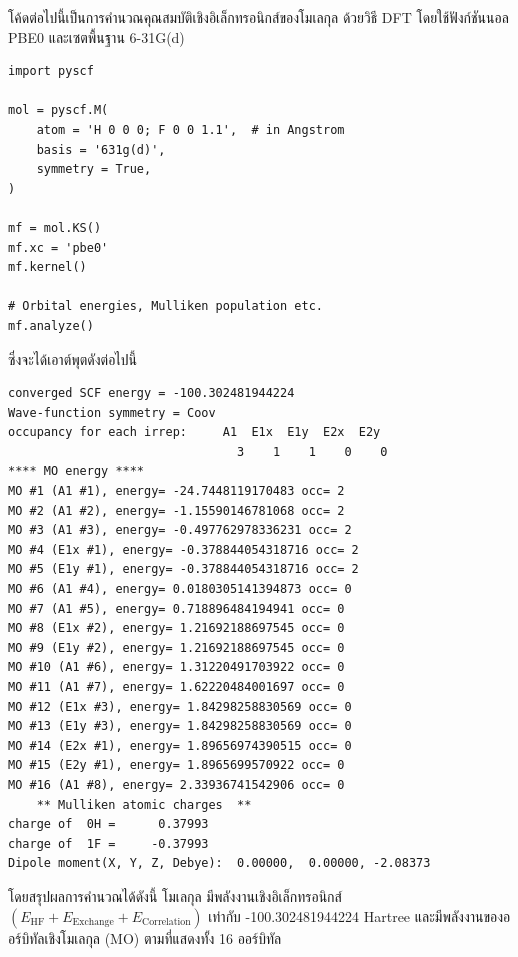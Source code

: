 โค้ดต่อไปนี้เป็นการคำนวณคุณสมบัติเชิงอิเล็กทรอนิกส์ของโมเลกุล  ด้วยวิธี DFT โดยใช้ฟังก์ชันนอล PBE0 และเซตพื้นฐาน 6-31G(d)

\begin{lstlisting}[style=MyPython]
import pyscf

mol = pyscf.M(
    atom = 'H 0 0 0; F 0 0 1.1',  # in Angstrom
    basis = '631g(d)',
    symmetry = True,
)

mf = mol.KS()
mf.xc = 'pbe0'
mf.kernel()

# Orbital energies, Mulliken population etc.
mf.analyze()
\end{lstlisting}

\vspace{1em}
\noindent ซึ่งจะได้เอาต์พุตดังต่อไปนี้

\begin{lstlisting}[style=plain]
converged SCF energy = -100.302481944224
Wave-function symmetry = Coov
occupancy for each irrep:     A1  E1x  E1y  E2x  E2y
                                3    1    1    0    0
**** MO energy ****
MO #1 (A1 #1), energy= -24.7448119170483 occ= 2
MO #2 (A1 #2), energy= -1.15590146781068 occ= 2
MO #3 (A1 #3), energy= -0.497762978336231 occ= 2
MO #4 (E1x #1), energy= -0.378844054318716 occ= 2
MO #5 (E1y #1), energy= -0.378844054318716 occ= 2
MO #6 (A1 #4), energy= 0.0180305141394873 occ= 0
MO #7 (A1 #5), energy= 0.718896484194941 occ= 0
MO #8 (E1x #2), energy= 1.21692188697545 occ= 0
MO #9 (E1y #2), energy= 1.21692188697545 occ= 0
MO #10 (A1 #6), energy= 1.31220491703922 occ= 0
MO #11 (A1 #7), energy= 1.62220484001697 occ= 0
MO #12 (E1x #3), energy= 1.84298258830569 occ= 0
MO #13 (E1y #3), energy= 1.84298258830569 occ= 0
MO #14 (E2x #1), energy= 1.89656974390515 occ= 0
MO #15 (E2y #1), energy= 1.8965699570922 occ= 0
MO #16 (A1 #8), energy= 2.33936741542906 occ= 0
    ** Mulliken atomic charges  **
charge of  0H =      0.37993
charge of  1F =     -0.37993
Dipole moment(X, Y, Z, Debye):  0.00000,  0.00000, -2.08373
\end{lstlisting}

\vspace{1em}

โดยสรุปผลการคำนวณได้ดังนี้ โมเลกุล  มีพลังงานเชิงอิเล็กทรอนิกส์ $(E_{\text{HF}} + E_{\text{Exchange}} + E_{\text{Correlation}})$ เท่ากับ -100.302481944224 Hartree และมีพลังงานของออร์บิทัลเชิงโมเลกุล (MO) ตามที่แสดงทั้ง 16 ออร์บิทัล
